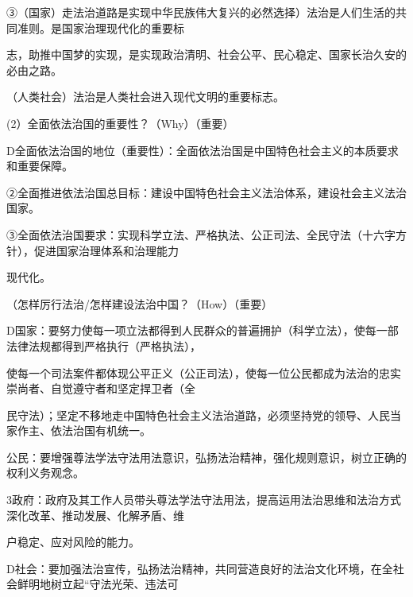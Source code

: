 \documentclass[lang=cn,11pt]{elegantbook}
\newcommand{\daofasym}[1]{{\daofasymbolfont #1}}
\newcommand{\daofasym}[1]{#1}
\begin{document}
\daofasym{③}（国家）走法治道路是实现中华民族伟大复兴的必然选择）法治是人们生活的共同准则。是国家治理现代化的重要标\par

志，助推中国梦的实现，是实现政治清明、社会公平、民心稳定、国家长治久安的必由之路。\par

（人类社会）法治是人类社会进入现代文明的重要标志。\par

(2）全面依法治国的重要性？（Why）（重要）\par

D全面依法治国的地位（重要性）：全面依法治国是中国特色社会主义的本质要求和重要保障。\par

\daofasym{②}全面推进依法治国总目标：建设中国特色社会主义法治体系，建设社会主义法治国家。\par

\daofasym{③}全面依法治国要求：实现科学立法、严格执法、公正司法、全民守法（十六字方针），促进国家治理体系和治理能力\par

现代化。\par

（怎样厉行法治/怎样建设法治中国？（How）（重要）\par

D国家：要努力使每一项立法都得到人民群众的普遍拥护（科学立法），使每一部法律法规都得到严格执行（严格执法），\par

使每一个司法案件都体现公平正义（公正司法），使每一位公民都成为法治的忠实崇尚者、自觉遵守者和坚定捍卫者（全\par

民守法）；坚定不移地走中国特色社会主义法治道路，必须坚持党的领导、人民当家作主、依法治国有机统一。\par

公民：要增强尊法学法守法用法意识，弘扬法治精神，强化规则意识，树立正确的权利义务观念。\par

3政府：政府及其工作人员带头尊法学法守法用法，提高运用法治思维和法治方式深化改革、推动发展、化解矛盾、维\par

户稳定、应对风险的能力。\par

D社会：要加强法治宣传，弘扬法治精神，共同营造良好的法治文化环境，在全社会鲜明地树立起“守法光荣、违法可\par
\end{document}
